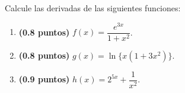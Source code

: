 
Calcule las derivadas de las siguientes funciones:
\begin{enumerate}[label=\alph*)]
\item \textbf{(0.8 puntos)} $f(x)=\dfrac{e^{3x}}{1+x^2}$.
\item \textbf{(0.8 puntos)} $g(x)=\ln\bigl\{x(1+3x^2)\bigr\}$.
\item \textbf{(0.9 puntos)} $h(x)=2^{5x}+\dfrac{1}{x^2}$.
\end{enumerate}

